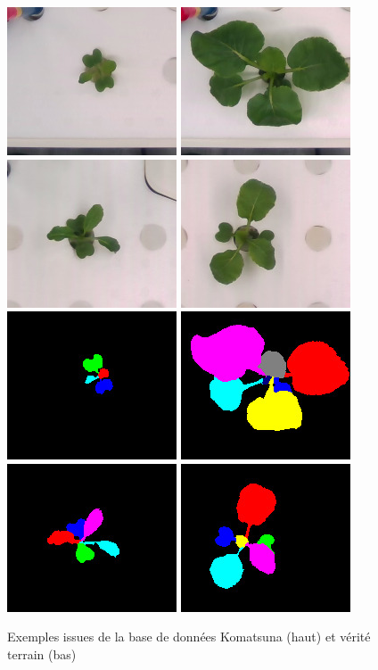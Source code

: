 \documentclass[../thesis.tex]{subfiles}
\begin{document}
    \begin{figure}[H]
        \centering
        \includegraphics[width=0.2\linewidth]{img/leaf/dataset-Komatsuna-rgb-1}
        \includegraphics[width=0.2\linewidth]{img/leaf/dataset-Komatsuna-rgb-2}
        \includegraphics[width=0.2\linewidth]{img/leaf/dataset-Komatsuna-rgb-3}
        \includegraphics[width=0.2\linewidth]{img/leaf/dataset-Komatsuna-rgb-4} \\
        \includegraphics[width=0.2\linewidth]{img/leaf/dataset-Komatsuna-label-1}
        \includegraphics[width=0.2\linewidth]{img/leaf/dataset-Komatsuna-label-2}
        \includegraphics[width=0.2\linewidth]{img/leaf/dataset-Komatsuna-label-3}
        \includegraphics[width=0.2\linewidth]{img/leaf/dataset-Komatsuna-label-4} \\
        \caption{Exemples issues de la base de données Komatsuna (haut) et vérité terrain (bas)}
        \label{fig:04- }
    \end{figure}
    
\end{document}
